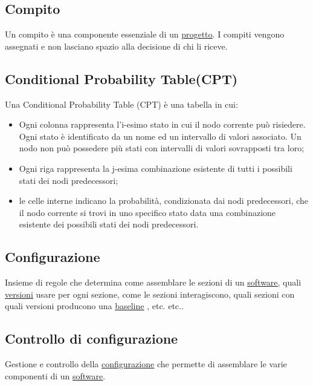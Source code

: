 	
	\subsection{Compito}
	\label{sec:compito}
	Un compito è una componente essenziale di un \underline{\hyperref[sec:progetto]{progetto}}. I compiti vengono assegnati e non lasciano spazio alla decisione di chi li riceve.

	
	\subsection{Conditional Probability Table(CPT)}
	\label{sec:CPT}
	Una Conditional Probability Table (CPT) è una tabella in cui:
		\begin{itemize}
			\item{Ogni colonna rappresenta l'i-esimo stato in cui il nodo corrente può risiedere. Ogni stato è identificato da un nome ed un intervallo di valori associato. Un nodo non può possedere più stati con intervalli di valori sovrapposti tra loro;}
			\item{Ogni riga rappresenta la j-esima combinazione esistente di tutti i possibili stati dei nodi predecessori;}
			\item{le celle interne indicano la probabilità, condizionata dai nodi predecessori, che il nodo corrente si trovi in uno specifico stato data una combinazione esistente dei possibili stati dei nodi predecessori.}
		\end{itemize}

	
	\subsection{Configurazione}
	\label{sec:configurazione}
	Insieme di regole che determina come assemblare le sezioni di un \underline{\hyperref[sec:prodottosoftware]{software}}, quali \underline{\hyperref[sec:versione]{versioni}} usare per ogni sezione, come le sezioni interagiscono, quali sezioni con quali versioni producono una \underline{\hyperref[sec:baseline]{baseline}} , etc. etc..


	\subsection{Controllo di configurazione}
	\label{sec:controlloconfigurazione}
	Gestione e controllo della \underline{\hyperref[sec:configurazione]{configurazione}} che permette di assemblare le varie componenti di un \underline{\hyperref[sec:prodottosoftware]{software}}.



